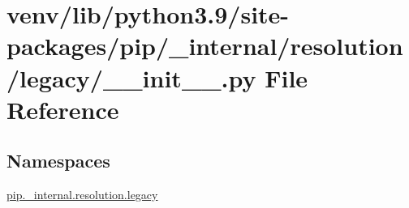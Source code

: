 \hypertarget{venv_2lib_2python3_89_2site-packages_2pip_2__internal_2resolution_2legacy_2____init_____8py}{}\section{venv/lib/python3.9/site-\/packages/pip/\+\_\+internal/resolution/legacy/\+\_\+\+\_\+init\+\_\+\+\_\+.py File Reference}
\label{venv_2lib_2python3_89_2site-packages_2pip_2__internal_2resolution_2legacy_2____init_____8py}
\subsection*{Namespaces}
\begin{DoxyCompactItemize}
\item 
 \hyperlink{namespacepip_1_1__internal_1_1resolution_1_1legacy}{pip.\+\_\+internal.\+resolution.\+legacy}
\end{DoxyCompactItemize}
